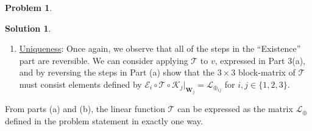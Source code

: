 \documentclass{book}
\theoremstyle{definition}
\newtheorem*{prob*}{Problem}
\newtheorem*{sln*}{Solution}
\newcommand{\V}{\mathbf{V}}
\newcommand{\W}{\mathbf{W}}
\newcommand{\lag}{\mathcal{L}}
\newcommand{\K}{\mathcal{K}}
\newcommand{\E}{\mathcal{E}}
\newcommand{\T}{\mathcal{T}}
\begin{document}
\begin{prob*}
\begin{sln*}
\begin{enumerate}
\begin{enumerate}
\begin{align*}
\begin{bmatrix}
				\Pi_3 \circ \maltese^{-1}\circ \T (w_1) 
				\end{bmatrix}\right)\\
				&= 
				\maltese\circ\maltese^{-1}\circ \T(w_1),\hspace{0.2cm}\text{by Part 2(a) of Problem 1}\\
				&= \T(w_1)
				\end{align*} 
				By the definition of $\maltese$, we can write this as
				\begin{align*}
				\lag(w_1 + \mathbf{0}_\V + \mathbf{0}_\V) = \lag(w_1) = \T(w_1).
				\end{align*}
				In general, the equality above also holds if we start with any $v = w_1 + w_2 + w_3 \in \V$ with $w_i \in \W_i$ for $i=\{1,2,3\}$, because as we have shown in Part 2(a) of Problem 1, $v$ can be written as
				\begin{align*}
				v = \begin{pmatrix}
				w_1\\\mathbf{0}_\V \\ \mathbf{0}_\V
				\end{pmatrix}_\maltese + 
				\begin{pmatrix}
				\mathbf{0}_\V\\w_2 \\ \mathbf{0}_\V
				\end{pmatrix}_\maltese + 
				\begin{pmatrix}
				\mathbf{0}_\V\\\mathbf{0}_\V \\ w_3
				\end{pmatrix}_\maltese,
				\end{align*}
				and the linearity of $\lag$ and $\T$ ensures $\lag(v) = \T(v)$. Hence, $\T$ can expressed as the matrix $\lag$ whose elements are defined as
				\begin{align*}
				\lag_{ij} = \E_i \circ \T \circ \K_j\bigg\vert_{\W_j}.
				\end{align*}
				
				
				\item \underline{Uniqueness}: Once again, we observe that all of the steps in the ``Existence'' part are reversible. We can consider applying $\T$ to $v$, expressed in Part 3(a), and by reversing the steps in Part (a) show that the $3\times 3$ block-matrix of $\T$ must consist elements defined by $\E_i \circ \T \circ \K_j\bigg\vert_{\W_j} = \lag_{\oplus_{ij}}$ for $i,j\in \{1,2,3\}$. \\ 
			\end{enumerate}
		From parts (a) and (b), the linear function $\T$ can be expressed as the matrix $\lag_\oplus$ defined in the problem statement in exactly one way. 
			

\end{enumerate}
\end{sln*}
\end{prob*}
\end{document}

